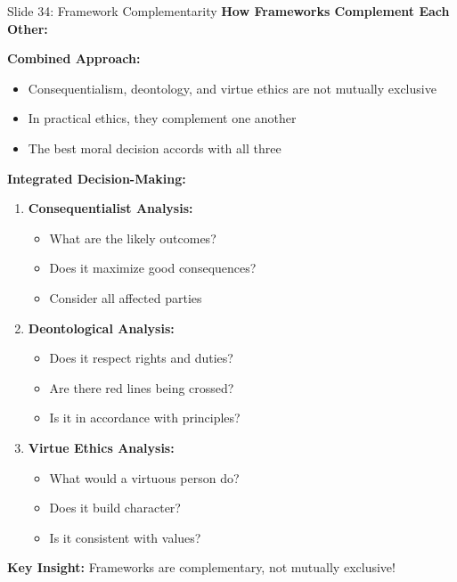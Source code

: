 \documentclass[8pt]{beamer}
\begin{document}
	\begin{frame}{Slide 34: Framework Complementarity}
		\fontsize{6.5}{7.5}\selectfont
		\textbf{How Frameworks Complement Each Other:}
		
		\vspace{0.1cm}
		\textbf{Combined Approach:}
		\begin{itemize}
			\item Consequentialism, deontology, and virtue ethics are not mutually exclusive
			\item In practical ethics, they complement one another
			\item The best moral decision accords with all three
		\end{itemize}
		
		\vspace{0.1cm}
		\textbf{Integrated Decision-Making:}
		\begin{enumerate}
			\item \textbf{Consequentialist Analysis:}
			\begin{itemize}
				\item What are the likely outcomes?
				\item Does it maximize good consequences?
				\item Consider all affected parties
			\end{itemize}
			\item \textbf{Deontological Analysis:}
			\begin{itemize}
				\item Does it respect rights and duties?
				\item Are there red lines being crossed?
				\item Is it in accordance with principles?
			\end{itemize}
			\item \textbf{Virtue Ethics Analysis:}
			\begin{itemize}
				\item What would a virtuous person do?
				\item Does it build character?
				\item Is it consistent with values?
			\end{itemize}
		\end{enumerate}
		
		\textcolor{myblue}{\textbf{Key Insight:}} Frameworks are \textcolor{myblue}{complementary, not mutually exclusive}!
	\end{frame}
	
\end{document}
